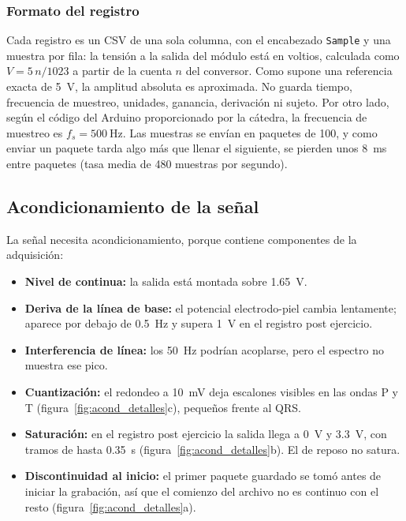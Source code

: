 \subsubsection{Formato del registro}
\label{sec:formato}
Cada registro es un CSV de una sola columna, con el encabezado \texttt{Sample} y una muestra por fila: la tensión a la salida del módulo está en voltios, calculada como $V = 5\,n/1023$ a partir de la cuenta $n$ del conversor. Como supone una referencia exacta de \SI{5}{\volt}, la amplitud absoluta es aproximada. No guarda tiempo, frecuencia de muestreo, unidades, ganancia, derivación ni sujeto.
Por otro lado, según el código del Arduino proporcionado por la cátedra, la frecuencia de muestreo es $f_s = \SI{500}{\hertz}$. Las muestras se envían en paquetes de 100, y como enviar un paquete tarda algo más que llenar el siguiente, se pierden unos \SI{8}{\milli\second} entre paquetes (tasa media de 480 muestras por segundo).

\subsection{Acondicionamiento de la señal}
\label{sec:met-acondicionamiento}
La señal necesita acondicionamiento, porque contiene componentes de la adquisición:
\begin{itemize}
  \setlength{\itemsep}{0pt}\setlength{\parskip}{0pt}
  \item \textbf{Nivel de continua:} la salida está montada sobre \SI{1.65}{\volt}.
  \item \textbf{Deriva de la línea de base:} el potencial electrodo-piel cambia lentamente; aparece por debajo de \SI{0.5}{\hertz} y supera \SI{1}{\volt} en el registro post ejercicio.
  \item \textbf{Interferencia de línea:} los \SI{50}{\hertz} podrían acoplarse, pero el espectro no muestra ese pico.
  \item \textbf{Cuantización:} el redondeo a \SI{10}{\milli\volt} deja escalones visibles en las ondas P y T (figura~\ref{fig:acond_detalles}c), pequeños frente al QRS.
  \item \textbf{Saturación:} en el registro post ejercicio la salida llega a \SI{0}{\volt} y \SI{3.3}{\volt}, con tramos de hasta \SI{0.35}{\second} (figura~\ref{fig:acond_detalles}b). El de reposo no satura.
  \item \textbf{Discontinuidad al inicio:} el primer paquete guardado se tomó antes de iniciar la grabación, así que el comienzo del archivo no es continuo con el resto (figura~\ref{fig:acond_detalles}a).
\end{itemize}

